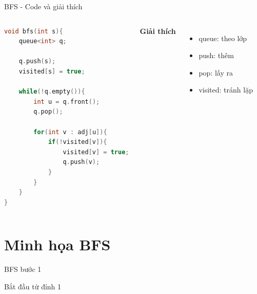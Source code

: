 \documentclass{beamer}
\newcommand{\hlblue}[1]{\textcolor{myblue}{#1}}
\newcommand{\hlgreen}[1]{\textcolor{mygreen}{#1}}
\newcommand{\hlred}[1]{\textcolor{myred}{#1}}
\newcommand{\hlpurple}[1]{\textcolor{mypurple}{#1}}
\begin{document}
\begin{frame}[fragile]{BFS - Code và giải thích}

\begin{columns}

\begin{tcolorbox}
\begin{lstlisting}[language=C++]
void bfs(int s){
    queue<int> q;

    q.push(s);
    visited[s] = true;

    while(!q.empty()){
        int u = q.front();
        q.pop();

        for(int v : adj[u]){
            if(!visited[v]){
                visited[v] = true;
                q.push(v);
            }
        }
    }
}
\end{lstlisting}
\end{tcolorbox}


\textbf{Giải thích}

\begin{itemize}
\item \hlblue{queue}: theo lớp
\item \hlgreen{push}: thêm
\item \hlred{pop}: lấy ra
\item \hlpurple{visited}: tránh lặp
\end{itemize}

\end{columns}

\end{frame}

\section{Minh họa BFS}

\begin{frame}{BFS bước 1}
\begin{center}
\end{center}

Bắt đầu từ đỉnh 1
\end{frame}
\end{document}
